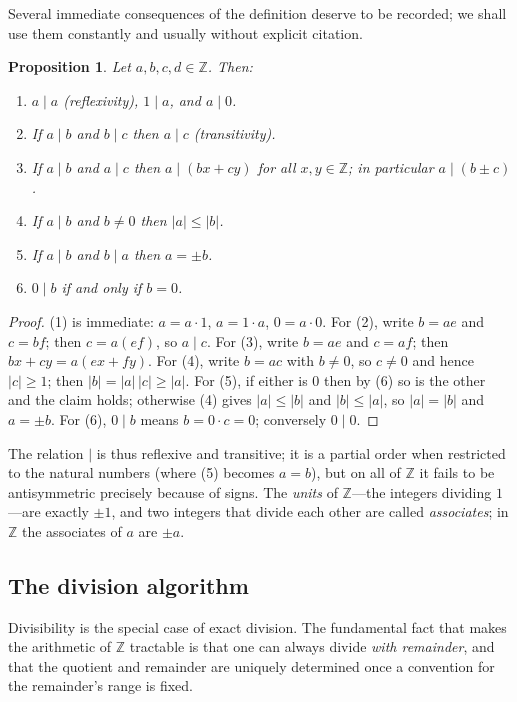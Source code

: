\documentclass[11pt,a4paper]{article}
\newtheorem{proposition}[theorem]{Proposition}
\theoremstyle{definition}
\theoremstyle{remark}
\newcommand{\Z}{\ensuremath{\mathbb{Z}}}
\begin{document}
Several immediate consequences of the definition deserve to be recorded; we shall use them constantly and usually without explicit citation.

\begin{proposition}\label{intmod:prop:divprops}
Let \(a,b,c,d\in\Z\). Then:
\begin{enumerate}
\item \(a\mid a\) (reflexivity), \(1\mid a\), and \(a\mid 0\).
\item If \(a\mid b\) and \(b\mid c\) then \(a\mid c\) (transitivity).
\item If \(a\mid b\) and \(a\mid c\) then \(a\mid (bx+cy)\) for all \(x,y\in\Z\); in particular \(a\mid (b\pm c)\).
\item If \(a\mid b\) and \(b\neq 0\) then \(|a|\le |b|\).
\item If \(a\mid b\) and \(b\mid a\) then \(a=\pm b\).
\item \(0\mid b\) if and only if \(b=0\).
\end{enumerate}
\end{proposition}

\begin{proof}
(1) is immediate: \(a=a\cdot 1\), \(a=1\cdot a\), \(0=a\cdot 0\). For (2), write \(b=ae\) and \(c=bf\); then \(c=a(ef)\), so \(a\mid c\). For (3), write \(b=ae\) and \(c=af\); then \(bx+cy=a(ex+fy)\). For (4), write \(b=ac\) with \(b\neq 0\), so \(c\neq 0\) and hence \(|c|\ge 1\); then \(|b|=|a|\,|c|\ge |a|\). For (5), if either is \(0\) then by (6) so is the other and the claim holds; otherwise (4) gives \(|a|\le|b|\) and \(|b|\le|a|\), so \(|a|=|b|\) and \(a=\pm b\). For (6), \(0\mid b\) means \(b=0\cdot c=0\); conversely \(0\mid 0\).
\end{proof}

The relation \(\mid\) is thus reflexive and transitive; it is a partial order when restricted to the natural numbers (where (5) becomes \(a=b\)), but on all of \(\Z\) it fails to be antisymmetric precisely because of signs. The \emph{units} of \(\Z\)—the integers dividing \(1\)—are exactly \(\pm 1\), and two integers that divide each other are called \emph{associates}; in \(\Z\) the associates of \(a\) are \(\pm a\).

\subsection{The division algorithm}\label{intmod:sub:divalg}

Divisibility is the special case of exact division. The fundamental fact that makes the arithmetic of \(\Z\) tractable is that one can always divide \emph{with remainder}, and that the quotient and remainder are uniquely determined once a convention for the remainder's range is fixed.
\end{document}
